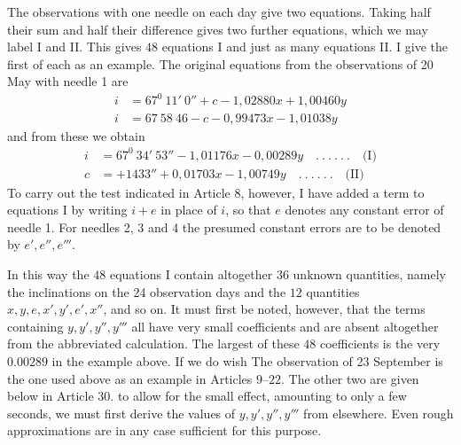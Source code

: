 The observations with one needle on each day give two equations. Taking half their sum and half their difference gives two further equations, which we may label I and II. This gives $48$ equations I and just as many equations II. I give the first of each as an example. The original equations from the observations of 20 May with needle 1 are
\[
\begin{aligned}
i&=67^0\ 11'\ 0''+c-1{,}02880x+1{,}00460y\\
i&=67\ 58\ 46-c-0{,}99473x-1{,}01038y
\end{aligned}
\]
and from these we obtain
\[
\begin{aligned}
i&=67^0\ 34'\ 53''-1{,}01176x-0{,}00289y\quad.\ .\ .\ .\ .\ .\quad\text{(I)}\\
c&=+1433''+0{,}01703x-1{,}00749y\quad.\ .\ .\ .\ .\ .\quad\text{(II)}
\end{aligned}
\]
To carry out the test indicated in Article 8, however, I have added a term to equations I by writing $i+e$ in place of $i$, so that $e$ denotes any constant error of needle 1. For needles 2, 3 and 4 the presumed constant errors are to be denoted by $e',e'',e'''$.

In this way the $48$ equations I contain altogether $36$ unknown quantities, namely the inclinations on the 24 observation days and the $12$ quantities $x,y,e,x',y',e',x''$, and so on. It must first be noted, however, that the terms containing $y,y',y'',y'''$ all have very small coefficients and are absent altogether from the abbreviated calculation. The largest of these $48$ coefficients is the very $0.00289$ in the example above. If we do wish
\expandafter\def\csname HistoricalNoteText486\endcsname{The observation of 23 September is the one used above as an example in Articles $9$–$22$. The other two are given below in Article $30$.}
to allow for the small effect, amounting to only a few seconds, we must first derive the values of $y,y',y'',y'''$ from elsewhere. Even rough approximations are in any case sufficient for this purpose.

